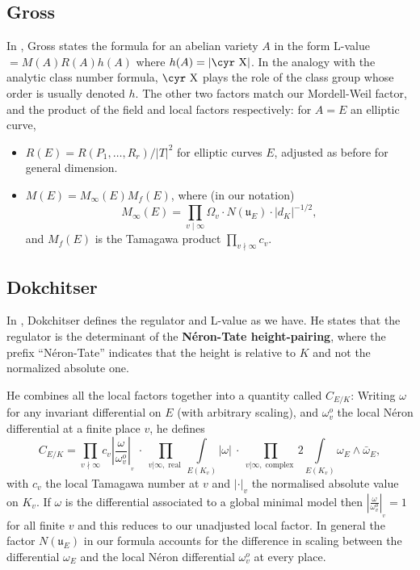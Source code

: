 \documentclass{amsart}
\newcommand{\Sha}{\text{\cyr X}}
\DeclareMathOperator{\real}{real}
\DeclareMathOperator{\complex}{complex}
\begin{document}
\subsection{Gross}\label{gross}

In \cite{Gross}, Gross states the formula for an abelian variety $A$
in the form L-value\(=M(A)R(A)h(A)\) where \(h(A)=|\Sha|\). In the
analogy with the analytic class number formula, $\Sha$ plays the role
of the class group whose order is usually denoted \(h\). The other two
factors match our Mordell-Weil factor, and the product of the field
and local factors respectively: for $A=E$ an elliptic curve,
\begin{itemize}
  \item
\(R(E)=R(P_1,\dots,R_r)/|T|^2\) for elliptic curves \(E\), adjusted as
before for general dimension.
\item
\(M(E) = M_{\infty}(E)M_f(E)\), where (in our notation)
\[M_{\infty}(E) = \prod_{v\mid\infty}\Omega_v \cdot N(\mathfrak{u}_E) \cdot |d_K|^{-1/2},\]
and \(M_f(E)\) is the Tamagawa product \(\prod_{v\nmid\infty}c_v\).
\end{itemize}

\subsection{Dokchitser}\label{dokchitser}

In \cite[pp.~3--5]{Dok}, Dokchitser defines the regulator and L-value
as we have. He states that the regulator is the determinant of the
\textbf{N\'eron-Tate height-pairing}, where the prefix
``N\'eron-Tate'' indicates that the height is relative to \(K\) and
not the normalized absolute one.

He combines all the local factors together into a quantity called
\(C_{E/K}\): Writing \(\omega\) for any invariant differential on \(E\)
(with arbitrary scaling), and \(\omega_v^o\) the local N\'eron
differential at a finite place \(v\), he defines \[
  C_{E/K} = \prod_{v\nmid\infty} c_v \left\vert\frac{\omega}{\omega_v^o}\right\vert_{_v}
    \>\cdot\>\prod_{{v|\infty},{\real}} \int\limits_{E(K_v)}\!\! |\omega|
    \>\cdot\>\prod_{{v|\infty},{\complex}} 2\!\!\!\int\limits_{E(K_v)}\!\! \omega_E\wedge \bar\omega_E,
\] with \(c_v\) the local Tamagawa number at \(v\) and \(|\cdot|_v\) the
normalised absolute value on \(K_v\). If \(\omega\) is the differential
associated to a global minimal model then
\(\left\vert\frac{\omega}{\omega_v^o}\right\vert_{_v}=1\) for all finite
\(v\) and this reduces to our unadjusted local factor. In general the
factor \(N(\mathfrak{u}_E)\) in our formula accounts for the difference in
scaling between the differential \(\omega_E\) and the local N\'eron
differential \(\omega_v^o\) at every place.
\end{document}
